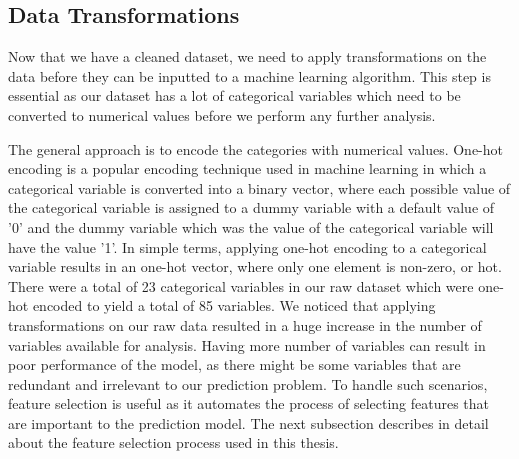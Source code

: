 \documentclass[11pt,openright]{report}
\begin{document}
\subsection {Data Transformations}
Now that we have a cleaned dataset, we need to apply transformations on the data before they can be inputted to a machine learning algorithm. This step is essential as our dataset has a lot of categorical variables which need to be converted to numerical values before we perform any further analysis. 

The general approach is to encode the categories with numerical values. One-hot encoding is a popular encoding technique used in machine learning in which a categorical variable is converted into a binary vector, where each possible value of the categorical variable is assigned to a dummy variable with a default value of '0' and the dummy variable which was the value of the categorical variable will have the value '1'. In simple terms, applying one-hot encoding to a categorical variable results in an one-hot vector, where only one element is non-zero, or hot. There were a total of 23 categorical variables in our raw dataset which were one-hot encoded to yield a total of 85 variables. We noticed that applying transformations on our raw data resulted in a huge increase in the number of variables available for analysis. Having more number of variables can result in poor performance of the model, as there might be some variables that are redundant and irrelevant to our prediction problem. To handle such scenarios, feature selection is useful as it automates the process of selecting features that are important to the prediction model. The next subsection describes in detail about the feature selection process used in this thesis.
\end{document}
